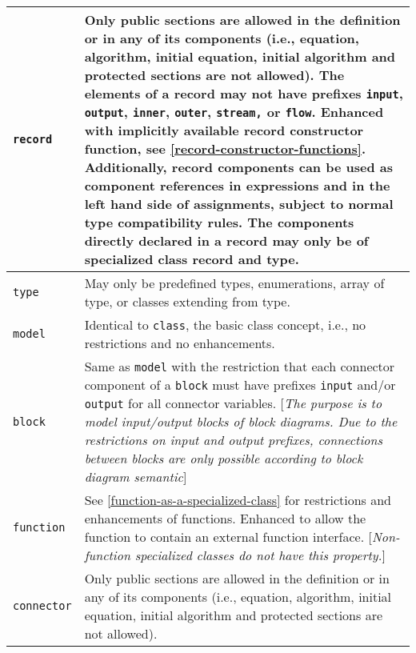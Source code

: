 \begin{longtable}{|p{4cm}|p{9cm}|} 
\hline \endhead
\lstinline!record! & Only public sections are allowed in the definition or
in any of its components (i.e., equation, algorithm, initial equation,
initial algorithm and protected sections are not allowed). The elements
of a record may not have prefixes \lstinline!input!, \lstinline!output!,
\lstinline!inner!, \lstinline!outer!, \lstinline!stream,!
or \lstinline!flow!. Enhanced with implicitly available record constructor function,
see \autoref{record-constructor-functions}. Additionally, record components can be used as
component references in expressions and in the left hand side of
assignments, subject to normal type compatibility rules. The components
directly declared in a record may only be of specialized class record
and type.\\ \hline
\lstinline!type! & May only be predefined types, enumerations, array of
type, or classes extending from type.\\ \hline
\lstinline!model! & Identical to \lstinline!class!, the basic class concept, i.e., no
restrictions and no enhancements.\\ \hline
\lstinline!block! & Same as \lstinline!model! with the restriction that each connector
component of a \lstinline!block! must have prefixes \lstinline!input! and/or \lstinline!output! for all
connector variables. {[}\emph{The purpose is to model input/output
blocks of block diagrams. Due to the restrictions on input and output
prefixes, connections between blocks are only possible according to
block diagram semantic}{]}\\ \hline
\lstinline!function! & See \autoref{function-as-a-specialized-class} for restrictions
and enhancements of functions. Enhanced to allow the
function to contain an external function interface.
{[}\emph{Non-function specialized classes do not have this
property.}{]}\\ \hline
\lstinline!connector! & Only public sections are allowed in the definition or in any of its
components (i.e., equation, algorithm, initial equation, initial
algorithm and protected sections are not allowed).


\end{longtable}
